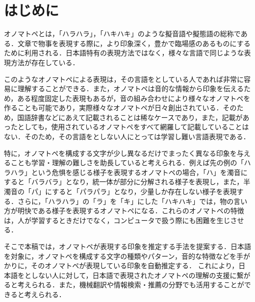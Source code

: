 \documentclass[japanese]{jnlp_1.4}
\newcommand{\addtext}[1]{}
\begin{document}
\maketitle


\section{はじめに}

オノマトペとは，「ハラハラ」，「ハキハキ」のような擬音語や擬態語の総称である．文章で物事を表現する際に，より印象深く，豊かで臨場感のあるものにするために利用される．日本語特有の表現方法ではなく，様々な言語で同じような表現方法が存在している\addtext{{\cite{Book_03}}}．

このようなオノマトペによる表現は，その言語を\addtext{母語}としている人であれば非常に容易に理解することができる．また，オノマトペは音的な情報から印象を伝えるため，ある程度固定した表現もあるが，音の組み合わせにより様々なオノマトペを作ることも可能であり，実際様々なオノマトペが日々創出されている\addtext{{\cite{Book_05,Book_06}}}．そのため，国語辞書などにあえて記載されることは稀なケースであり，また，記載があったとしても，使用されているオノマトペをすべて網羅して記載していることはない\addtext{{\cite{Book_04}}}．そのため，その言語を\addtext{母語}としない人にとっては学習し難い言語表現である．

特に，オノマトペを構成する文字が少し異なるだけでまったく異なる印象を与えることも学習・理解の難しさを助長していると考えられる．例えば先の例の「ハラハラ」という危惧を感じる様子を表現するオノマトペの場合，「ハ」を濁音にすると「バラバラ」となり，統一体が部分に分解される様子を表現し，また，半濁音の「パ」にすると「パラパラ」となり，少量しか存在しない様子を表現する．さらに，「ハラハラ」の「ラ」を「キ」にした「ハキハキ」では，物の言い方が明快である様子を表現するオノマトペになる．これらのオノマトペの特徴は，人が学習するときだけでなく，コンピュータで扱う際にも困難を生じさせる．

そこで本稿では，オノマトペが表現する印象を推定する手法を提案する．日本語を対象に，オノマトペを構成する文字の種類やパターン，音的な特徴などを手がかりに，そのオノマトペが表現している印象を自動推定する．
\addtext{例えば，「チラチラ」というオノマトペの印象を知りたい場合，本手法を用いたシステムに入力すると「少ない」や「軽い」などという形容詞でその印象を表現し出力することができる．}これにより，日本語を\addtext{{母語}}としない人に対して，日本語で表現されたオノマトペの理解の支援に繋がると考えられる．また，機械翻訳や情報検索・推薦の分野でも活用することができると考えられる．
\end{document}
